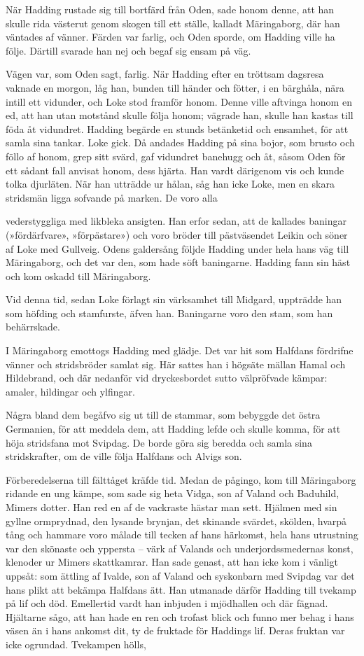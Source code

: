 När Hadding rustade sig till bortfärd från Oden, sade honom denne, att
han skulle rida västerut genom skogen till ett ställe, kalladt
Märingaborg, där han väntades af vänner. Färden var farlig, och Oden
sporde, om Hadding ville ha följe. Därtill svarade han nej och begaf sig
ensam på väg.

Vägen var, som Oden sagt, farlig. När Hadding efter en tröttsam dagsresa
vaknade en morgon, låg han, bunden till händer och fötter, i en
bärghåla, nära intill ett vidunder, och Loke stod framför honom. Denne
ville aftvinga honom en ed, att han utan motstånd skulle följa honom;
vägrade han, skulle han kastas till föda åt vidundret. Hadding begärde
en stunds betänketid och ensamhet, för att samla sina tankar. Loke gick.
Då andades Hadding på sina bojor, som brusto och föllo af honom, grep
sitt svärd, gaf vidundret banehugg och åt, såsom Oden för ett sådant
fall anvisat honom, dess hjärta. Han vardt därigenom vis och kunde tolka
djurläten. När han utträdde ur hålan, såg han icke Loke, men en skara
stridsmän ligga sofvande på marken. De voro alla

vederstyggliga med likbleka ansigten. Han erfor sedan, att de kallades
baningar (»fördärfvare», »förpästare») och voro bröder till pästväsendet
Leikin och söner af Loke med Gullveig. Odens galdersång följde Hadding
under hela hans väg till Märingaborg, och det var den, som hade söft
baningarne. Hadding fann sin häst och kom oskadd till Märingaborg.

Vid denna tid, sedan Loke förlagt sin värksamhet till Midgard, uppträdde
han som höfding och stamfurste, äfven han. Baningarne voro den stam, som
han behärrskade.

I Märingaborg emottogs Hadding med glädje. Det var hit som Halfdans
fördrifne vänner och stridsbröder samlat sig. Här sattes han i högsäte
mällan Hamal och Hildebrand, och där nedanför vid dryckesbordet sutto
välpröfvade kämpar: amaler, hildingar och ylfingar.

Några bland dem begåfvo sig ut till de stammar, som bebyggde det östra
Germanien, för att meddela dem, att Hadding lefde och skulle komma, för
att höja stridsfana mot Svipdag. De borde göra sig beredda och samla
sina stridskrafter, om de ville följa Halfdans och Alvigs son.

Förberedelserna till fälttåget kräfde tid. Medan de pågingo, kom till
Märingaborg ridande en ung kämpe, som sade sig heta Vidga, son af Valand
och Baduhild, Mimers dotter. Han red en af de vackraste hästar man sett.
Hjälmen med sin gyllne ormprydnad, den lysande brynjan, det skinande
svärdet, skölden, hvarpå tång och hammare voro målade till tecken af
hans härkomst, hela hans utrustning var den skönaste och yppersta --
värk af Valands och underjordssmedernas konst, klenoder ur Mimers
skattkamrar. Han sade genast, att han icke kom i vänligt uppsåt: som
ättling af Ivalde, son af Valand och syskonbarn med Svipdag var det hans
plikt att bekämpa Halfdans ätt. Han utmanade därför Hadding till tvekamp
på lif och död. Emellertid vardt han inbjuden i mjödhallen och där
fägnad. Hjältarne sågo, att han hade en ren och trofast blick och funno
mer behag i hans väsen än i hans ankomst dit, ty de fruktade för
Haddings lif. Deras fruktan var icke ogrundad. Tvekampen hölls,

